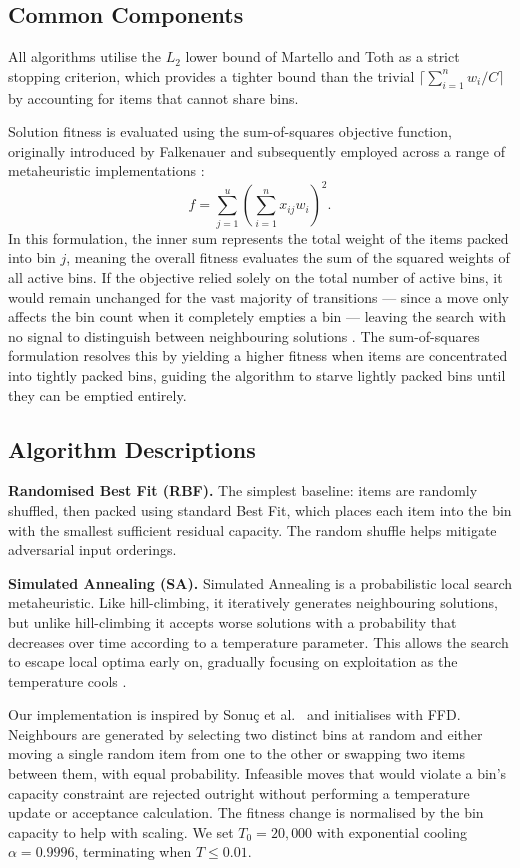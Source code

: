 \documentclass[11pt]{article}
\begin{document}
\subsection{Common Components}

All algorithms utilise the $L_2$ lower bound of Martello and Toth \cite{martello} as a strict stopping criterion, which provides a tighter bound than the trivial $\lceil \sum_{i=1}^{n} w_i / C \rceil$ by accounting for items that cannot share bins.

Solution fitness is evaluated using the sum-of-squares objective function, originally introduced by Falkenauer \cite{gga} and subsequently employed across a range of metaheuristic implementations \cite{sonuc, kryz}:
$$f = \sum_{j=1}^{u} \left( {\sum_{i=1}^{n} x_{ij} w_{i}} \right)^2.$$
In this formulation, the inner sum represents the total weight of the items packed into bin $j$, meaning the overall fitness evaluates the sum of the squared weights of all active bins. If the objective relied solely on the total number of active bins, it would remain unchanged for the vast majority of transitions — since a move only affects the bin count when it completely empties a bin — leaving the search with no signal to distinguish between neighbouring solutions \cite{gga}. The sum-of-squares formulation resolves this by yielding a higher fitness when items are concentrated into tightly packed bins, guiding the algorithm to starve lightly packed bins until they can be emptied entirely.

\subsection{Algorithm Descriptions}

\textbf{Randomised Best Fit (RBF).} The simplest baseline: items are randomly shuffled, then packed using standard Best Fit, which places each item into the bin with the smallest sufficient residual capacity. The random shuffle helps mitigate adversarial input orderings.

\textbf{Simulated Annealing (SA).} Simulated Annealing is a probabilistic local search metaheuristic. Like hill-climbing, it iteratively generates neighbouring solutions, but unlike hill-climbing it accepts worse solutions with a probability that decreases over time according to a temperature parameter. This allows the search to escape local optima early on, gradually focusing on exploitation as the temperature cools \cite{gendreau}.

Our implementation is inspired by Sonu\c{c} et al.\ \cite{sonuc} and initialises with FFD. Neighbours are generated by selecting two distinct bins at random and either moving a single random item from one to the other or swapping two items between them, with equal probability. Infeasible moves that would violate a bin's capacity constraint are rejected outright without performing a temperature update or acceptance calculation. The fitness change is normalised by the bin capacity to help with scaling. We set $T_0 = 20{,}000$ with exponential cooling $\alpha = 0.9996$, terminating when $T \leq 0.01$.
\end{document}
